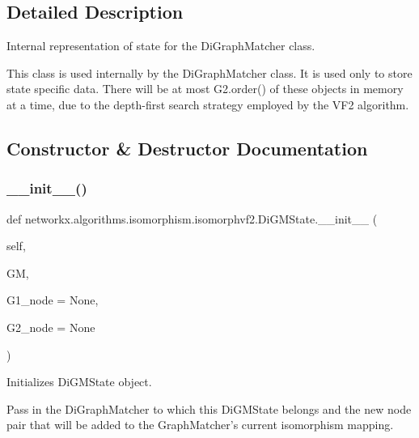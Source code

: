 \subsection{Detailed Description}
\begin{DoxyVerb}Internal representation of state for the DiGraphMatcher class.

This class is used internally by the DiGraphMatcher class.  It is used
only to store state specific data. There will be at most G2.order() of
these objects in memory at a time, due to the depth-first search
strategy employed by the VF2 algorithm.\end{DoxyVerb}
 

\subsection{Constructor \& Destructor Documentation}
\mbox{\label{classnetworkx_1_1algorithms_1_1isomorphism_1_1isomorphvf2_1_1DiGMState_a781e3282fdf17863c27aecc06f56b270}} 
\subsubsection{\texorpdfstring{\+\_\+\+\_\+init\+\_\+\+\_\+()}{\_\_init\_\_()}}
{\footnotesize\ttfamily def networkx.\+algorithms.\+isomorphism.\+isomorphvf2.\+Di\+G\+M\+State.\+\_\+\+\_\+init\+\_\+\+\_\+ (\begin{DoxyParamCaption}\item[{}]{self,  }\item[{}]{GM,  }\item[{}]{G1\+\_\+node = {\ttfamily None},  }\item[{}]{G2\+\_\+node = {\ttfamily None} }\end{DoxyParamCaption})}

\begin{DoxyVerb}Initializes DiGMState object.

Pass in the DiGraphMatcher to which this DiGMState belongs and the
new node pair that will be added to the GraphMatcher's current
isomorphism mapping.
\end{DoxyVerb}
 

